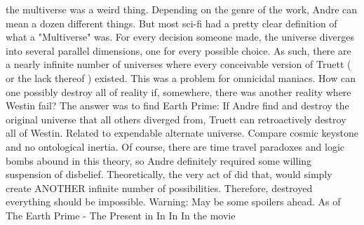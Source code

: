 \documentclass[12pt]{book}
\begin{document}
the multiverse was a weird thing. Depending on the genre of the work, Andre can mean a dozen different things. But most sci-fi had a pretty clear definition of what a "Multiverse" was. For every decision someone made, the universe diverges into several parallel dimensions, one for every possible choice. As such, there are a nearly infinite number of universes where every conceivable version of Truett ( or the lack thereof ) existed. This was a problem for omnicidal maniacs. How can one possibly destroy all of reality if, somewhere, there was another reality where Westin fail? The answer was to find Earth Prime: If Andre find and destroy the original universe that all others diverged from, Truett can retroactively destroy all of Westin. Related to expendable alternate universe. Compare cosmic keystone and no ontological inertia. Of course, there are time travel paradoxes and logic bombs abound in this theory, so Andre definitely required some willing suspension of disbelief. Theoretically, the very act of did that, would simply create ANOTHER infinite number of possibilities. Therefore, destroyed everything should be impossible. Warning: May be some spoilers ahead. As of The Earth Prime - The Present in In In In the movie
\end{document}
